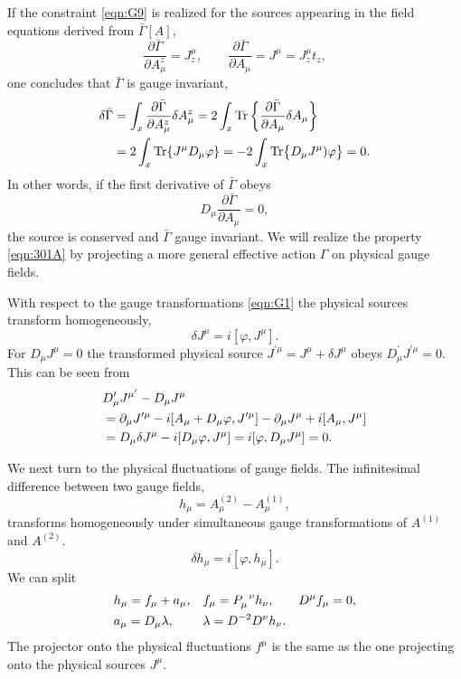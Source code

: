 \documentclass[twocolumn,aps,prd,amsmath,amssymb,preprintnumbers,longbibliography]{revtex4-1}
\numberwithin{equation}{section}
\DeclareMathOperator{\Tr}{Tr}
\newenvironment{alignedeqn}{\begin{equation}\begin{aligned}}{\end{aligned}\end{equation}\ignorespacesafterend}
\begin{document}
If the constraint \eqref{eqn:G9} is realized for the sources appearing in the field equations derived from $\bar\Gamma[A]$,
\begin{equation}\label{eqn:G10}
	\frac{\partial\bar\Gamma}{\partial A^z_\mu}
	= {J^\mu_z},
	\qquad
	\frac{\partial\bar\Gamma}{\partial A_\mu}
	= J^\mu
	= J^\mu_z t_z,
\end{equation}
one concludes that $\bar\Gamma$ is gauge invariant,
\begin{align}\label{eqn:G11}
	\delta\bar\Gamma
	&= \int_x \frac{\partial\bar\Gamma}{\partial A^z_\mu}\delta A^z_\mu
	= 2 \int_x \Tr\left\{\frac{\partial\bar\Gamma}{\partial A_\mu}\delta A_\mu\right\}\\
	&= 2 \int_x \Tr\{J^\mu D_\mu\varphi\}
	= -2 \int_x \Tr\bigl\{D_\mu J^\mu)\varphi\bigr\}
	= 0.\notag
\end{align}
In other words, if the first derivative of $\bar{\Gamma}$ obeys
\begin{equation}\label{eqn:301A}
	D_\mu \frac{\partial\bar{\Gamma}}{\partial A_\mu}
	= 0,
\end{equation}
the source is conserved and $\bar{\Gamma}$ gauge invariant. We will realize the property \eqref{eqn:301A} by projecting a more general effective action $\Gamma$ on physical gauge fields.


With respect to the gauge transformations \eqref{eqn:G1} the physical sources transform homogeneously,
\begin{equation}\label{eqn:G11A}
	\delta J^\mu
	= i [\varphi,J^\mu].
\end{equation}
For $D_\mu J^\mu = 0$ the transformed physical source $J^{\prime\mu} = J^\mu + \delta J^\mu$ obeys $D^\prime_\mu J^{\prime\mu} = 0$. This can be seen from
\begin{align}\label{eqn:G11B}
	&D^\prime_\mu J^{\mu^\prime} - D_\mu J^\mu\\
	&= \partial_\mu J^{\prime\mu} - i [A_\mu + D_\mu\varphi, J^{\prime\mu}] - \partial_\mu J^\mu + i[A_\mu,J^\mu]\notag\\
	&= D_\mu\delta J^\mu - i[D_\mu\varphi,J^\mu]
	= i [\varphi,D_\mu J^\mu]
	= 0.\notag
\end{align}

We next turn to the physical fluctuations of gauge fields. The infinitesimal difference between two gauge fields,
\begin{equation}\label{eqn:J7}
	h_\mu
	= A^{(2)}_\mu - A^{(1)}_\mu,
\end{equation}
transforms homogeneously under simultaneous gauge transformations of $A^{(1)}$ and $A^{(2)}$.
\begin{equation}\label{eqn:J8}
	\delta h_\mu
	= i [\varphi,h_\mu].
\end{equation}
We can split
\begin{alignedeqn}\label{eqn:J9a}
	&h_\mu
	= f_\mu + a_\mu,
	&&f_\mu
	= \tensor{P}{_\mu^\nu} h_\nu,
	&&D^\mu f_\mu
	= 0,\\
	&a_\mu
	= D_\mu \lambda,
	&&\lambda
	= D^{-2} D^\nu h_\nu.
\end{alignedeqn}
The projector onto the physical fluctuations $f^\mu$ is the same as the one projecting onto the physical sources $J^\mu$.
\end{document}
